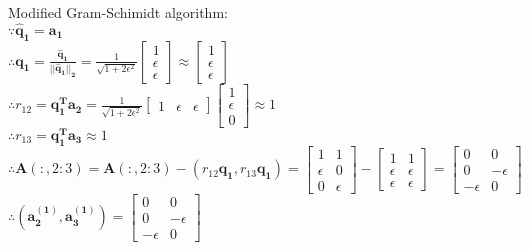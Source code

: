 \documentclass[english,onecolumn]{IEEEtran}
\begin{document}
\begin{enumerate}
    Modified Gram-Schimidt algorithm:\\
    $\because \mathbf{\hat{q}_1 = a_1}$\\
    $  \therefore \mathbf{q_1 = \frac{\hat{q}_1}{||\hat{q}_1||_2}} = 
    \frac{1}{\sqrt{1+2 \epsilon^2}}
    \begin{bmatrix}
    1 \\ \epsilon \\ \epsilon 
    \end{bmatrix} \approx \begin{bmatrix}
    1 \\ \epsilon \\ \epsilon 
    \end{bmatrix}
    $\\
    $\therefore    r_{12} = \mathbf{q_1^T a_2}  = \frac{1}{\sqrt{1+2 \epsilon^2}}
    \begin{bmatrix}
    1 & \epsilon & \epsilon 
    \end{bmatrix}
    \begin{bmatrix}
    1 \\ \epsilon \\ 0 
    \end{bmatrix} \approx  1$\\
    $\therefore    r_{13} = \mathbf{q_1^T  a_3}  \approx 1$\\
    $\therefore     \mathbf{A}(:,2:3) = \mathbf{A}(:,2:3) - (r_{12} \mathbf{q_1}, r_{13} \mathbf{q_1}) = 
    \begin{bmatrix}
    1 & 1 \\ \epsilon & 0 \\ 0 & \epsilon 
    \end{bmatrix} - 
    \begin{bmatrix}
    1 & 1 \\ 
    \epsilon & \epsilon \\ 
    \epsilon & \epsilon
    \end{bmatrix} = 
    \begin{bmatrix}
    0 & 0 \\ 
    0 & -\epsilon \\ 
    -\epsilon & 0
    \end{bmatrix}$\\
    $\therefore  (\mathbf{a_2^{(1)}, a_3^{(1)}})=\begin{bmatrix}
    0 & 0 \\ 
    0 & -\epsilon \\ 
    -\epsilon & 0
    \end{bmatrix}
    $\\
    

\end{enumerate}
\end{document}
